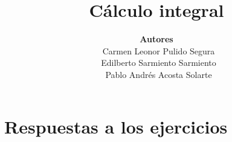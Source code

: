 \documentclass[12pt]{book}
\theoremstyle{definition}
\begin{document}
\setlength{\parindent}{0cm} %
\setlength{\parskip}{2mm} %

\thispagestyle{empty}
\frontmatter
\title{
{\bf Cálculo integral}
}

\author{\textbf{Autores}\\
{\large {\ Carmen Leonor Pulido Segura}}\\
{\large {\ Edilberto Sarmiento Sarmiento}}\\
{\large {\ Pablo Andrés Acosta Solarte}}\\
}

\date{}
\maketitle

\fancyhead{}
\fancyfoot{}





\tableofcontents

\thispagestyle{empty}


\fancyhead{}
\fancyhead[LO]{\scriptsize \leftmark}%
\fancyhead[RE]{\scriptsize \rightmark}%
\fancyfoot{}

\thispagestyle{empty}

\mainmatter


\setcounter{page}{1}




\printbibliography

\chapter*{Respuestas a los ejercicios}
\listofanswers

\backmatter


\end{document}
